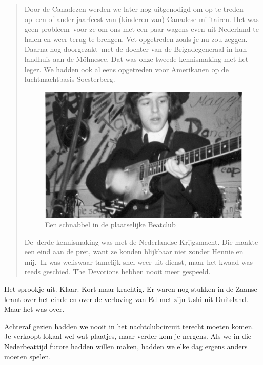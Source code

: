 \documentclass[12pt,twoside, openright]{memoir}
\begin{document}
\begin{quote}
Door de Canadezen werden we later nog uitgenodigd om op te treden op een of ander jaarfeest van (kinderen van) Canadese militairen. Het was geen probleem voor ze om ons met een paar wagens even uit Nederland te halen en weer terug te brengen. Vet opgetreden zoals je nu zou zeggen. Daarna nog doorgezakt met de dochter van de Brigadegeneraal in hun landhuis aan de Möhnesee. Dat was onze tweede kennismaking met het leger. We hadden ook al eens opgetreden voor Amerikanen op de luchtmachtbasis Soesterberg. 

\begin{figure}[t]
\centering
\includegraphics[width=\textwidth]{img/164beatclub}
\caption*{\footnotesize Een schnabbel in de plaatselijke Beatclub}
\end{figure}

De derde kennismaking was met de Nederlandse Krijgsmacht. Die maakte een eind aan de pret, want ze konden blijkbaar niet zonder Hennie en mij. Ik was weliswaar tamelijk snel weer uit dienst, maar het kwaad was reeds geschied. The Devotions hebben nooit meer gespeeld.
\end{quote}

Het sprookje uit. Klaar. Kort maar krachtig. Er waren nog stukken in de Zaanse krant over het einde en over de verloving van Ed met zijn Ushi uit Duitsland. Maar het was over.

Achteraf gezien hadden we nooit in het nachtclubcircuit terecht moeten komen. Je verkoopt lokaal wel wat plaatjes, maar verder kom je nergens. Als we in die Nederbeattijd furore hadden willen maken, hadden we elke dag ergens anders moeten spelen.
\end{document}

